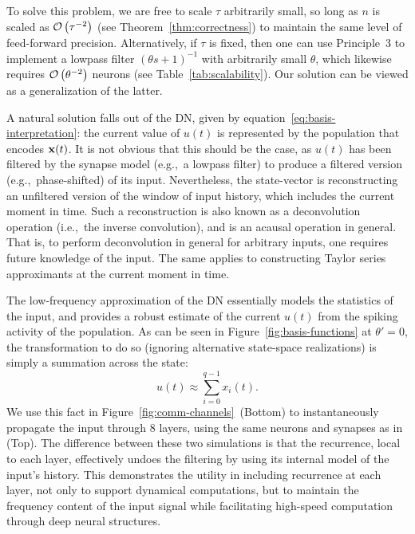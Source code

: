 To solve this problem, we are free to scale $\tau$ arbitrarily small, so long as $n$ is scaled as $\mathcal{O}\left({\tau^{-2}}\right)$ (see Theorem~\ref{thm:correctness}) to maintain the same level of feed-forward precision.
Alternatively, if $\tau$ is fixed, then one can use Principle~3 to implement a lowpass filter $\left(\theta s + 1\right)^{-1}$ with arbitrarily small $\theta$, which likewise requires $\mathcal{O}\left({\theta^{-2}}\right)$ neurons (see Table~\ref{tab:scalability}).
Our solution can be viewed as a generalization of the latter.


A natural solution falls out of the DN, given by equation~\ref{eq:basis-interpretation}: the current value of $u(t)$ is represented by the population that encodes $\mathbf{x}(t)$.
It is not obvious that this should be the case, as $u(t)$ has been filtered by the synapse model (e.g.,~a lowpass filter) to produce a filtered version (e.g.,~phase-shifted) of its input.
Nevertheless, the state-vector is reconstructing an unfiltered version of the window of input history, which includes the current moment in time.
Such a reconstruction is also known as a deconvolution operation (i.e.,~the inverse convolution), and is an acausal operation in general.
That is, to perform deconvolution in general for arbitrary inputs, one requires future knowledge of the input.
The same applies to constructing Taylor series approximants at the current moment in time.

The low-frequency approximation of the DN essentially models the statistics of the input, and provides a robust estimate of the current $u(t)$ from the spiking activity of the population.
As can be seen in Figure~\ref{fig:basis-functions} at $\theta' = 0$, the transformation to do so (ignoring alternative state-space realizations) is simply a summation across the state:
\begin{equation}
u(t) \approx \sum_{i=0}^{q-1} x_i(t) \text{.}
\end{equation}
We use this fact in Figure~\ref{fig:comm-channels}~(Bottom) to instantaneously propagate the input through 8 layers, using the same neurons and synapses as in (Top).
The difference between these two simulations is that the recurrence, local to each layer, effectively undoes the filtering by using its internal model of the input's history.
This demonstrates the utility in including recurrence at each layer, not only to support dynamical computations, but to maintain the frequency content of the input signal while facilitating high-speed computation through deep neural structures.

